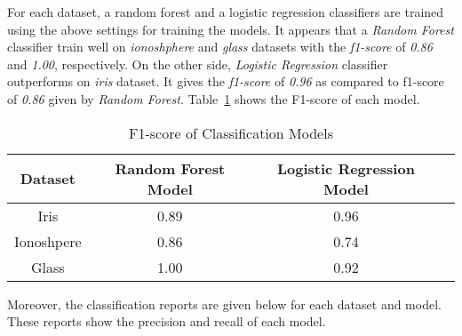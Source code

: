 \documentclass[english]{tktltiki2}
\theoremstyle{definition}
\theoremstyle{remark}
\begin{document}
For each dataset, a random forest and a logistic regression classifiers are trained using the above settings for training the models. It appears that a \textit{Random Forest} classifier train well on \textit{ionoshphere} and \textit{glass} datasets with the \textit{f1-score} of \textit{0.86} and \textit{1.00}, respectively. On the other side, \textit{Logistic Regression} classifier outperforms on \textit{iris} dataset. It gives the \textit{f1-score} of \textit{0.96} as compared to f1-score of \textit{0.86} given by \textit{Random Forest}. Table~\ref{table:training_models_F1_score_datasets_UCI} shows the F1-score of each model.


\begin{table}[H]
	\caption{F1-score of Classification Models}
	\label{table:training_models_F1_score_datasets_UCI}
	\begin{center}
		\begin{tabular}{@{}cccc@{}}
			\toprule
			Dataset & Random Forest Model & Logistic Regression Model \\ \hline
			
			\multicolumn{1}{|c|}{Iris} & \multicolumn{1}{c|}{0.89} & \multicolumn{1}{c|}{0.96} \\ \hline
			
			\multicolumn{1}{|c|}{Ionoshpere} & \multicolumn{1}{c|}{0.86} & \multicolumn{1}{c|}{0.74} \\ \hline
			
			\multicolumn{1}{|c|}{Glass} & \multicolumn{1}{c|}{1.00} & \multicolumn{1}{c|}{0.92} \\ \hline
			
		\end{tabular}
	\end{center}
\end{table}



Moreover, the classification reports are given below for each dataset and model. These reports show the precision and recall of each model.
\end{document}
